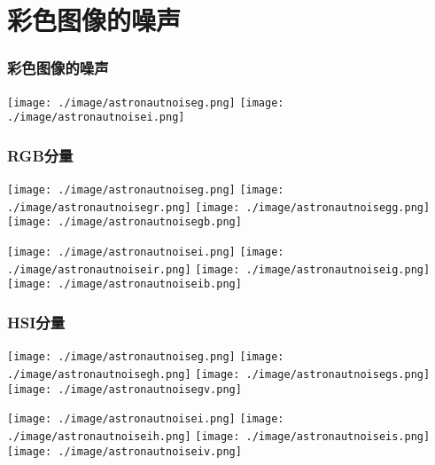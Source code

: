 \documentclass{beamer}
\begin{document}
\section{彩色图像的噪声}
\label{sec-8}
\begin{frame}
\frametitle{彩色图像的噪声}
\label{sec-8-1}

\texttt{[image: ./image/astronautnoiseg.png]}
\texttt{[image: ./image/astronautnoisei.png]}
\end{frame}
\begin{frame}
\frametitle{RGB分量}
\label{sec-8-2}

\texttt{[image: ./image/astronautnoiseg.png]}
\texttt{[image: ./image/astronautnoisegr.png]}
\texttt{[image: ./image/astronautnoisegg.png]}
\texttt{[image: ./image/astronautnoisegb.png]}

\texttt{[image: ./image/astronautnoisei.png]}
\texttt{[image: ./image/astronautnoiseir.png]}
\texttt{[image: ./image/astronautnoiseig.png]}
\texttt{[image: ./image/astronautnoiseib.png]}
\end{frame}
\begin{frame}
\frametitle{HSI分量}
\label{sec-8-3}

\texttt{[image: ./image/astronautnoiseg.png]}
\texttt{[image: ./image/astronautnoisegh.png]}
\texttt{[image: ./image/astronautnoisegs.png]}
\texttt{[image: ./image/astronautnoisegv.png]}

\texttt{[image: ./image/astronautnoisei.png]}
\texttt{[image: ./image/astronautnoiseih.png]}
\texttt{[image: ./image/astronautnoiseis.png]}
\texttt{[image: ./image/astronautnoiseiv.png]}
\end{frame}
\end{document}
